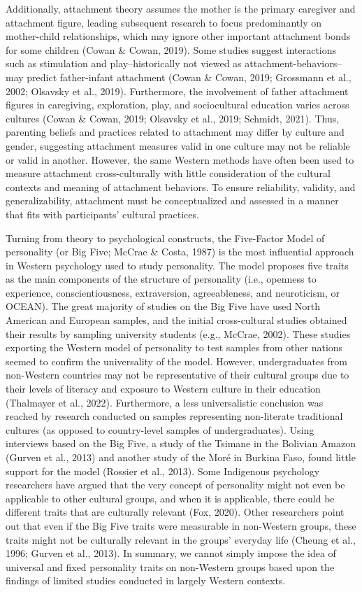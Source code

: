 \documentclass[
  11pt,
]{book}
\begin{document}
Additionally, attachment theory assumes the mother is the primary caregiver and attachment figure, leading subsequent research to focus predominantly on mother-child relationships, which may ignore other important attachment bonds for some children (Cowan \& Cowan, 2019). Some studies suggest interactions such as stimulation and play--historically not viewed as attachment-behaviors--may predict father-infant attachment (Cowan \& Cowan, 2019; Grossmann et al., 2002; Olsavsky et al., 2019). Furthermore, the involvement of father attachment figures in caregiving, exploration, play, and sociocultural education varies across cultures (Cowan \& Cowan, 2019; Olsavsky et al., 2019; Schmidt, 2021). Thus, parenting beliefs and practices related to attachment may differ by culture and gender, suggesting attachment measures valid in one culture may not be reliable or valid in another. However, the same Western methods have often been used to measure attachment cross-culturally with little consideration of the cultural contexts and meaning of attachment behaviors. To ensure reliability, validity, and generalizability, attachment must be conceptualized and assessed in a manner that fits with participants' cultural practices.

Turning from theory to psychological constructs, the Five-Factor Model of personality (or Big Five; McCrae \& Costa, 1987) is the most influential approach in Western psychology used to study personality. The model proposes five traits as the main components of the structure of personality (i.e., openness to experience, conscientiousness, extraversion, agreeableness, and neuroticism, or OCEAN). The great majority of studies on the Big Five have used North American and European samples, and the initial cross-cultural studies obtained their results by sampling university students (e.g., McCrae, 2002). These studies exporting the Western model of personality to test samples from other nations seemed to confirm the universality of the model. However, undergraduates from non-Western countries may not be representative of their cultural groups due to their levels of literacy and exposure to Western culture in their education (Thalmayer et al., 2022). Furthermore, a less universalistic conclusion was reached by research conducted on samples representing non-literate traditional cultures (as opposed to country-level samples of undergraduates). Using interviews based on the Big Five, a study of the Tsimane in the Bolivian Amazon (Gurven et al., 2013) and another study of the Moré in Burkina Faso, found little support for the model (Rossier et al., 2013). Some Indigenous psychology researchers have argued that the very concept of personality might not even be applicable to other cultural groups, and when it is applicable, there could be different traits that are culturally relevant (Fox, 2020). Other researchers point out that even if the Big Five traits were measurable in non-Western groups, these traits might not be culturally relevant in the groups' everyday life (Cheung et al., 1996; Gurven et al., 2013). In summary, we cannot simply impose the idea of universal and fixed personality traits on non-Western groups based upon the findings of limited studies conducted in largely Western contexts.
\end{document}
